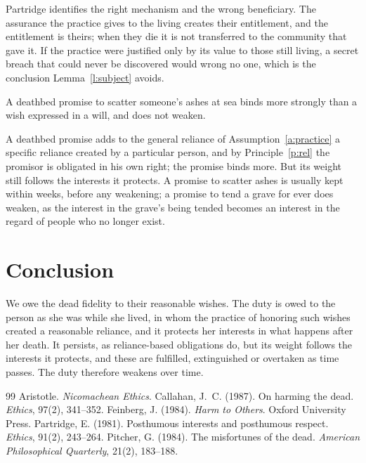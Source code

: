 \documentclass{situationist-preprint}
\begin{document}
\begin{reply}
Partridge identifies the right mechanism and the wrong beneficiary. The assurance the practice gives to the living creates their entitlement, and the entitlement is theirs; when they die it is not transferred to the community that gave it. If the practice were justified only by its value to those still living, a secret breach that could never be discovered would wrong no one, which is the conclusion Lemma~\ref{l:subject} avoids.
\end{reply}

\begin{objection}\label{o:promise}
A deathbed promise to scatter someone's ashes at sea binds more strongly than a wish expressed in a will, and does not weaken.
\end{objection}

\begin{reply}
A deathbed promise adds to the general reliance of Assumption~\ref{a:practice} a specific reliance created by a particular person, and by Principle~\ref{p:rel} the promisor is obligated in his own right; the promise binds more. But its weight still follows the interests it protects. A promise to scatter ashes is usually kept within weeks, before any weakening; a promise to tend a grave for ever does weaken, as the interest in the grave's being tended becomes an interest in the regard of people who no longer exist.
\end{reply}

\section{Conclusion}

We owe the dead fidelity to their reasonable wishes. The duty is owed to the person as she was while she lived, in whom the practice of honoring such wishes created a reasonable reliance, and it protects her interests in what happens after her death. It persists, as reliance-based obligations do, but its weight follows the interests it protects, and these are fulfilled, extinguished or overtaken as time passes. The duty therefore weakens over time.

\begin{thebibliography}{99}\small
{} Aristotle. \emph{Nicomachean Ethics}.
 Callahan, J.~C. (1987). On harming the dead. \emph{Ethics}, 97(2), 341--352.
 Feinberg, J. (1984). \emph{Harm to Others}. Oxford University Press.
 Partridge, E. (1981). Posthumous interests and posthumous respect. \emph{Ethics}, 91(2), 243--264.
 Pitcher, G. (1984). The misfortunes of the dead. \emph{American Philosophical Quarterly}, 21(2), 183--188.
\end{thebibliography}
\end{document}
